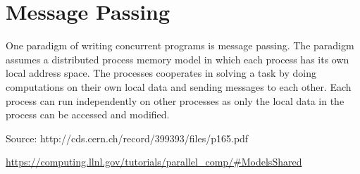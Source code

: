 \section{Message Passing}

One paradigm of writing concurrent programs is message passing. The paradigm assumes a distributed process memory model in which each process has its own local address space. The processes cooperates in solving a task by doing computations on their own local data and sending messages to each other. Each process can run independently on other processes as only the local data in the process can be accessed and modified.

Source: http://cds.cern.ch/record/399393/files/p165.pdf

\url{https://computing.llnl.gov/tutorials/parallel_comp/#ModelsShared}













